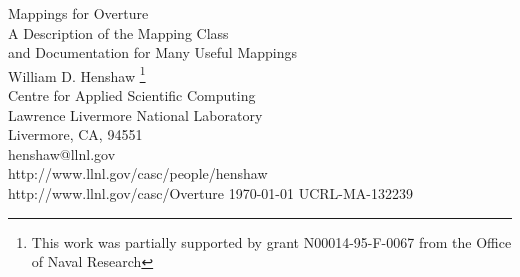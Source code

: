 \documentclass{article}
\begin{document}


\def\uvd    {{\bf U}}
\def\ud     {{    U}}
\def\pd     {{    P}}
\def\id     {i}
\def\jd     {j}
\def\kap {\sqrt{s+\omega^2}}

\newcommand{\mapping}{/home/henshaw/Overture/mapping}
\newcommand{\figures}{../docFigures}

\vspace{3\baselineskip}
\begin{flushleft}
  {\Large 
   Mappings for Overture  \\ 
   A Description of the Mapping Class  \\
   and Documentation for Many Useful Mappings \\
  }
\vspace{2\baselineskip}
William D. Henshaw               
\footnote{
        This work was partially
        supported by grant N00014-95-F-0067 from the Office of Naval
        Research
        }   \\
Centre for Applied Scientific Computing \\
Lawrence Livermore National Laboratory    \\
Livermore, CA, 94551   \\
henshaw@llnl.gov \\
http://www.llnl.gov/casc/people/henshaw \\
http://www.llnl.gov/casc/Overture
\vspace{1\baselineskip}
\today
\vspace{\baselineskip}
UCRL-MA-132239

\end{flushleft}

\vspace{1\baselineskip}
\end{document}

